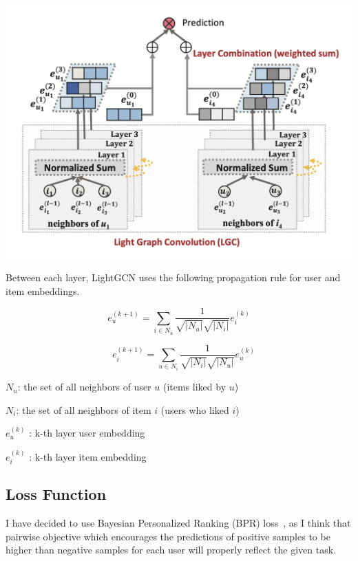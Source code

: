 \begin{minipage}{\linewidth}
    \centering%
    \includegraphics[scale=0.2]{assets/lgc_architecture.png}%
    \label{fig:impl:lgc_arch}%
\end{minipage}

Between each layer, LightGCN uses the following propagation rule for user and
item embeddings.

\begin{equation}
    e_u^{(k+1)} = \sum_{i \in N_u} \frac{1}{\sqrt{|N_u|}\sqrt{|N_i|}}e_i^{(k)}
\end{equation}

\begin{equation}
    \quad e_i^{(k+1)} = \sum_{u \in N_i} \frac{1}{\sqrt{|N_i|}\sqrt{|N_u|}} e_u^{(k)}
\end{equation}

$N_u$: the set of all neighbors of user $u$ (items liked by $u$)

$N_i$: the set of all neighbors of item $i$ (users who liked $i$)

$e_u^{(k)}$ : k-th layer user embedding

$e_i^{(k)}$ : k-th layer item embedding

\subsection{Loss Function}

I have decided to use Bayesian Personalized Ranking (BPR)
loss~\cite{rendleBPRBayesianPersonalized2012}, as I think that pairwise
objective which encourages the predictions of positive samples to be higher
than negative samples for each user will properly reflect the given task.

